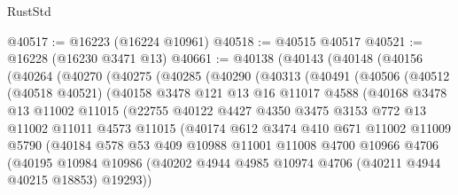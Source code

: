 \begin{lexlean}{RustStd}
\begin{coremodule}
@40517 := @16223 (@16224 @10961)
@40518 := @40515 @40517
@40521 := @16228 (@16230 @3471 @13)
@40661 := @40138
    (@40143
      (@40148
        (@40156
          (@40264
            (@40270
              (@40275
                (@40285
                  (@40290
                    (@40313
                      (@40491
                        (@40506
                          (@40512
                            (@40518 @40521)
                            (@40158
                              @3478
                              @121
                              @13
                              @16
                              @11017
                              @4588
                              (@40168
                                @3478
                                @13
                                @11002
                                @11015
                                (@22755
                                  @40122
                                  @4427
                                  @4350
                                  @3475
                                  @3153
                                  @772
                                  @13
                                  @11002
                                  @11011
                                  @4573
                                  @11015
                                  (@40174
                                    @612
                                    @3474
                                    @410
                                    @671
                                    @11002
                                    @11009
                                    @5790
                                    (@40184
                                      @578
                                      @53
                                      @409
                                      @10988
                                      @11001
                                      @11008
                                      @4700
                                      @10966
                                      @4706
                                      (@40195
                                        @10984
                                        @10986
                                        (@40202
                                          @4944
                                          @4985
                                          @10974
                                          @4706
                                          (@40211 @4944 @40215 @18853)
                                          @19293))

\end{coremodule}
\end{lexlean}
